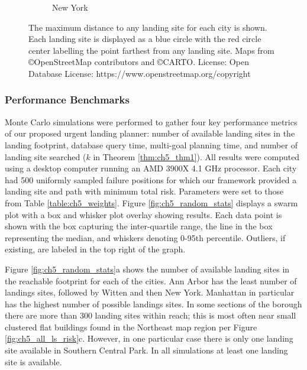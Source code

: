 \begin{figure}[!t]
\begin{subfigure}[b]{0.45\textwidth}
   \caption{New York}\label{subfig-1:dummy}
 \end{subfigure}
 \caption[Maximum distance between landing sites]{The maximum distance to any landing site for each city is shown. Each landing site is displayed as a blue circle with the red circle center labelling the point farthest from any landing site. Maps from \copyright OpenStreetMap contributors and \copyright CARTO. License: Open Database License: https://www.openstreetmap.org/copyright}\label{fig:ch5_farthest_landing_site}
\end{figure}



\subsubsection{Performance Benchmarks}\label{sec:ch5_key_metrics}

Monte Carlo simulations were performed to gather four key performance metrics of our proposed urgent landing planner: number of available landing sites in the landing footprint, database query time, multi-goal planning time, and number of landing site searched ($k$ in Theorem \ref{thm:ch5_thm1}). All results were computed using a desktop computer running an AMD 3900X 4.1 GHz processor. Each city had 500 uniformly sampled failure positions for which our framework provided a landing site and path with minimum total risk. Parameters were set to those from Table \ref{table:ch5_weights}. Figure \ref{fig:ch5_random_stats} displays a swarm plot with a box and whisker plot overlay showing results. Each data point is shown with the box capturing the inter-quartile range, the line in the box representing the median, and whiskers denoting 0-95th percentile. Outliers, if existing, are labeled in the top right of the graph. 

Figure \ref{fig:ch5_random_stats}a shows the number of available landing sites in the reachable footprint for each of the cities.  Ann Arbor has the least number of landings sites, followed by Witten and then New York. Manhattan in particular has the highest number of possible landings sites.  In some sections of the borough there are more than 300 landing sites within reach; this is most often near small clustered flat buildings found in the Northeast map region per Figure \ref{fig:ch5_all_ls_risk}c. However, in one particular case there is only one landing site available in Southern Central Park. In all simulations at least one landing site is available.

